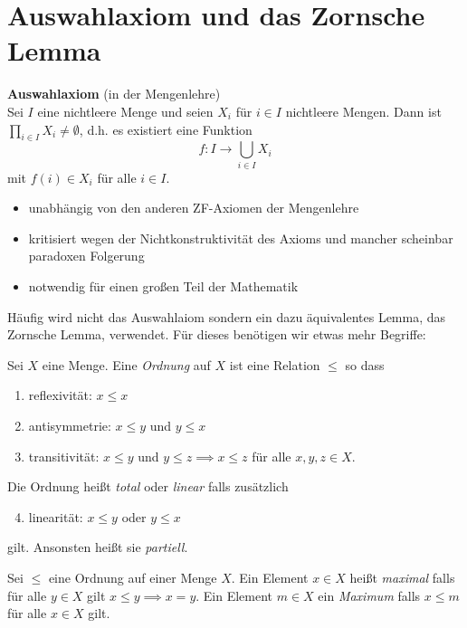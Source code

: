 \graphicspath{{Images/}}

\chapter{Auswahlaxiom und das Zornsche Lemma}

\textbf{Auswahlaxiom} (in der Mengenlehre)\\
	Sei $I$ eine nichtleere Menge und seien $X_{i}$ für $i \in I$ nichtleere Mengen.
	Dann ist $\prod_{i \in I} X_{i} \neq \emptyset$, d.h. es existiert eine Funktion
	\[
	f: I \to \bigcup_{i \in I} X_{i}
	\] 
	mit $f(i) \in X_{i}$ für alle $i \in I$.

\begin{remark}
	\begin{itemize}
		\item unabhängig von den anderen ZF-Axiomen der Mengenlehre
		\item kritisiert wegen der Nichtkonstruktivität des Axioms und mancher scheinbar paradoxen Folgerung
		\item notwendig für einen großen Teil der Mathematik
	\end{itemize}
\end{remark}

Häufig wird nicht das Auswahlaiom sondern ein dazu äquivalentes Lemma, das Zornsche Lemma, verwendet. Für dieses benötigen wir etwas mehr Begriffe:

\begin{definition}
	Sei $X$ eine Menge. Eine \emph{Ordnung} auf $X$ ist eine Relation $\leq$ so dass
	\begin{enumerate}[1)]
		\item reflexivität: $x \leq x$
		\item antisymmetrie: $x \leq y$ und $y \leq x$ 
		\item transitivität: $x \leq y$ und $y \leq z \implies x \leq z$ für alle $x,y,z \in X$.
	\end{enumerate}
	Die Ordnung heißt \emph{total} oder \emph{linear} falls zusätzlich
	\begin{enumerate}[1)]
		\setcounter{enumi}{3}
		\item linearität: $x \leq y$ oder $y \leq x$
	\end{enumerate}
	gilt. Ansonsten heißt sie \emph{partiell}.
\end{definition}


\begin{definition}
	Sei $\leq$ eine Ordnung auf einer Menge $X$. Ein Element $x \in X$ heißt \emph{maximal} falls für alle $y \in X$ gilt $x \leq y \implies x = y$.
	Ein Element $m \in X$ ein \emph{Maximum} falls $x \leq m$ für alle $x \in X$ gilt.
\end{definition}

